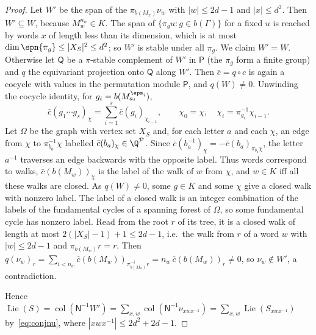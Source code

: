 \begin{proof}
Let $W'$ be the span of the $\pi_{b(M_x)}\nu_w$ with $|w|\le2d-1$ and $|x|\le d^2$. Then
$W'\subseteq W$, because $M_w^{n_w}\in K$. The span of $\{\pi_g u:g\in b(\Gamma)\}$ for a fixed $u$ is
reached by words $x$ of length less than its dimension, which is at most
$\dim\spn\{\pi_g\}\le|X_S|^2\le d^2$; so $W'$ is stable under all $\pi_g$. We claim $W'=W$. Otherwise
let $\mathsf Q$ be a $\pi$-stable complement of $W'$ in $\mathsf P$ (the $\pi_g$ form a finite group) and
$q$ the equivariant projection onto $\mathsf Q$ along $W'$. Then $\bar c=q\circ c$ is again a cocycle
with values in the permutation module $\mathsf P$, and $q(W)\ne0$. Unwinding the cocycle identity,
for $g_i=b(M_{a_i}^{\eps_i})$,
\[
\bar c(g_1\cdots g_s)_\chi=\sum_{i=1}^s\bar c(g_i)_{\chi_{i-1}},\qquad\chi_0=\chi,\quad
\chi_i=\pi_{g_i}^{-1}\chi_{i-1}.
\]
Let $\Omega$ be the graph with vertex set $X_S$ and, for each letter $a$ and each $\chi$, an edge from
$\chi$ to $\pi_{b_a}^{-1}\chi$ labelled $\bar c(b_a)_\chi\in\Q^{\mathcal P}$. Since
$\bar c(b_a^{-1})_\chi=-\bar c(b_a)_{\pi_{b_a}\chi}$, the letter $a^{-1}$ traverses an edge backwards
with the opposite label. Thus words correspond to walks, $\bar c(b(M_w))_\chi$ is the label of the walk
of $w$ from $\chi$, and $w\in K$ iff all these walks are closed. As $q(W)\ne0$, some $g\in K$ and some $\chi$
give a closed walk with nonzero label. The label of a closed walk is an integer combination of the labels
of the fundamental cycles of a spanning forest of $\Omega$, so some fundamental cycle has nonzero
label. Read from the root $r$ of its tree, it is a closed walk of length at most $2(|X_S|-1)+1\le2d-1$,
i.e.\ the walk from $r$ of a word $w$ with $|w|\le2d-1$ and $\pi_{b(M_w)}r=r$. Then
$q(\nu_w)_r=\sum_{i<n_w}\bar c(b(M_w))_{\pi^{-i}_{b(M_w)}r}=n_w\,\bar c(b(M_w))_r\ne0$, so
$\nu_w\notin W'$, a contradiction.

Hence $\operatorname{Lie}(S)=\operatorname{col}(\mathsf N^{-1}W')=\sum_{x,w}\operatorname{col}(\mathsf N^{-1}\nu_{xwx^{-1}})
=\sum_{x,w}\operatorname{Lie}(S_{xwx^{-1}})$ by~\eqref{eq:conjnu}, where $|xwx^{-1}|\le2d^2+2d-1$.
\end{proof}

